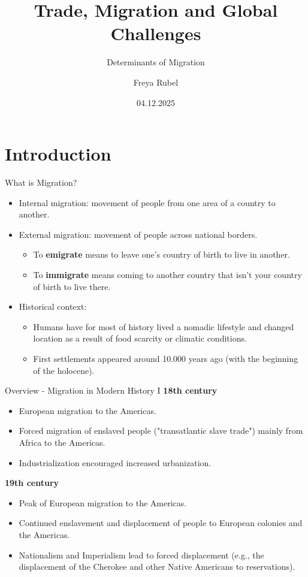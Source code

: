 \documentclass{beamer}
\author{Freya Rubel}
\title{Trade, Migration and Global Challenges}
\subtitle{Determinants of Migration}
\institute{}
\date{04.12.2025}
\begin{document}
\begin{frame}
    \titlepage
\end{frame}

\begin{frame}
    \tableofcontents[sectionstyle=show, subsectionstyle=show/shaded/hide, subsubsectionstyle=show/shaded/hide]
\end{frame}

\section{Introduction}
\begin{frame}{What is Migration?}
    \begin{itemize} \small
        \item Internal migration: movement of people from one area of a country to another.
        \item External migration: movement of people across national borders.
        \begin{itemize}
            \item To \textbf{emigrate} means to leave one's country of birth to live in another. 
            \item To \textbf{immigrate} means coming to another country that isn't your country of birth to live there.
        \end{itemize}
        \item Historical context: 
        \begin{itemize} \footnotesize
            \item Humans have for most of history lived a nomadic lifestyle and changed location as a result of food scarcity or climatic conditions.
            \item First settlements appeared around 10.000 years ago (with the beginning of the holocene).
        \end{itemize}
    \end{itemize}
\end{frame}

\begin{frame}{Overview - Migration in Modern History I}
    \textbf{18th century}
    \begin{itemize} \small
        \item European migration to the Americas.
        \item Forced migration of enslaved people ("transatlantic slave trade") mainly from Africa to the Americas.
        \item Industrialization encouraged increased urbanization.
    \end{itemize}
    \textbf{19th century}
    \begin{itemize} \small
        \item Peak of European migration to the Americas.
        \item Continued enslavement and displacement of people to European colonies and the Americas.
        \item Nationalism and Imperialism lead to forced displacement (e.g., the displacement of the Cherokee and other Native Americans to reservations).
    \end{itemize}
\end{frame}
\end{document}
